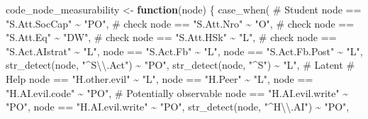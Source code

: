 \documentclass[
  letterpaper,
  DIV=11,
  numbers=noendperiod]{scrartcl}
\newenvironment{Shaded}{\begin{snugshade}}{\end{snugshade}}
\newcommand{\CommentTok}[1]{\textcolor[rgb]{0.37,0.37,0.37}{#1}}
\newcommand{\ControlFlowTok}[1]{\textcolor[rgb]{0.00,0.23,0.31}{\textbf{#1}}}
\newcommand{\FunctionTok}[1]{\textcolor[rgb]{0.28,0.35,0.67}{#1}}
\newcommand{\NormalTok}[1]{\textcolor[rgb]{0.00,0.23,0.31}{#1}}
\newcommand{\OtherTok}[1]{\textcolor[rgb]{0.00,0.23,0.31}{#1}}
\newcommand{\SpecialCharTok}[1]{\textcolor[rgb]{0.37,0.37,0.37}{#1}}
\newcommand{\StringTok}[1]{\textcolor[rgb]{0.13,0.47,0.30}{#1}}
\begin{document}
\begin{Shaded}
\begin{Highlighting}[]
\NormalTok{code\_node\_measurability }\OtherTok{\textless{}{-}} \ControlFlowTok{function}\NormalTok{(node) \{}
    \FunctionTok{case\_when}\NormalTok{(}
        \CommentTok{\# Student}
\NormalTok{        node }\SpecialCharTok{==} \StringTok{"S.Att.SocCap"} \SpecialCharTok{\textasciitilde{}} \StringTok{"PO"}\NormalTok{, }\CommentTok{\# check}
\NormalTok{        node }\SpecialCharTok{==} \StringTok{"S.Att.Nro"} \SpecialCharTok{\textasciitilde{}} \StringTok{"O"}\NormalTok{, }\CommentTok{\# check}
\NormalTok{        node }\SpecialCharTok{==} \StringTok{"S.Att.Eq"} \SpecialCharTok{\textasciitilde{}} \StringTok{"DW"}\NormalTok{, }\CommentTok{\# check}
\NormalTok{        node }\SpecialCharTok{==} \StringTok{"S.Att.HSk"} \SpecialCharTok{\textasciitilde{}} \StringTok{"L"}\NormalTok{, }\CommentTok{\# check}
\NormalTok{        node }\SpecialCharTok{==} \StringTok{"S.Act.AIstrat"} \SpecialCharTok{\textasciitilde{}} \StringTok{"L"}\NormalTok{,}
\NormalTok{        node }\SpecialCharTok{==} \StringTok{"S.Act.Fb"} \SpecialCharTok{\textasciitilde{}} \StringTok{"L"}\NormalTok{,}
\NormalTok{        node }\SpecialCharTok{==} \StringTok{"S.Act.Fb.Post"} \SpecialCharTok{\textasciitilde{}} \StringTok{"L"}\NormalTok{,}
        \FunctionTok{str\_detect}\NormalTok{(node, }\StringTok{"\^{}S}\SpecialCharTok{\textbackslash{}\textbackslash{}}\StringTok{.Act"}\NormalTok{) }\SpecialCharTok{\textasciitilde{}} \StringTok{"PO"}\NormalTok{, }
        \FunctionTok{str\_detect}\NormalTok{(node, }\StringTok{"\^{}S"}\NormalTok{) }\SpecialCharTok{\textasciitilde{}} \StringTok{"L"}\NormalTok{, }\CommentTok{\# Latent}
        \CommentTok{\# Help}
\NormalTok{        node }\SpecialCharTok{==} \StringTok{"H.other.evil"} \SpecialCharTok{\textasciitilde{}} \StringTok{"L"}\NormalTok{,}
\NormalTok{        node }\SpecialCharTok{==} \StringTok{"H.Peer"} \SpecialCharTok{\textasciitilde{}} \StringTok{"L"}\NormalTok{,}
\NormalTok{        node }\SpecialCharTok{==} \StringTok{"H.AI.evil.code"} \SpecialCharTok{\textasciitilde{}} \StringTok{"PO"}\NormalTok{, }\CommentTok{\# Potentially observable}
\NormalTok{        node }\SpecialCharTok{==} \StringTok{"H.AI.evil.write"} \SpecialCharTok{\textasciitilde{}} \StringTok{"PO"}\NormalTok{,}
\NormalTok{        node }\SpecialCharTok{==} \StringTok{"H.AI.evil.write"} \SpecialCharTok{\textasciitilde{}} \StringTok{"PO"}\NormalTok{,}
        \FunctionTok{str\_detect}\NormalTok{(node, }\StringTok{"\^{}H}\SpecialCharTok{\textbackslash{}\textbackslash{}}\StringTok{.AI"}\NormalTok{) }\SpecialCharTok{\textasciitilde{}} \StringTok{"PO"}\NormalTok{,}

\end{Highlighting}
\end{Shaded}
\end{document}
